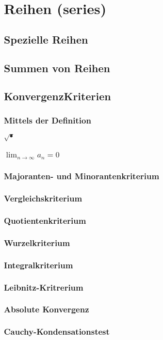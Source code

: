 \documentclass[a4paper,10pt]{scrartcl}
\begin{document}
\section{Reihen (series)}
	
	\subsection{Spezielle Reihen}
		
	\subsection{Summen von Reihen}
		
	\subsection{KonvergenzKriterien}
		
		\subsubsection{Mittels der Definition}
		$\sqrt{•}$
			
		\subsubsection{$\lim_{n\to\infty}a_n=0$}
			
		\subsubsection{Majoranten- und Minorantenkriterium}
			
		\subsubsection{Vergleichskriterium}
			
		\subsubsection{Quotientenkriterium}
			
		\subsubsection{Wurzelkriterium}
			
		\subsubsection{Integralkriterium}
			
		\subsubsection{Leibnitz-Kritrerium}
			
		\subsubsection{Absolute Konvergenz}
			
		\subsubsection{Cauchy-Kondensationstest}
			
\end{document}

